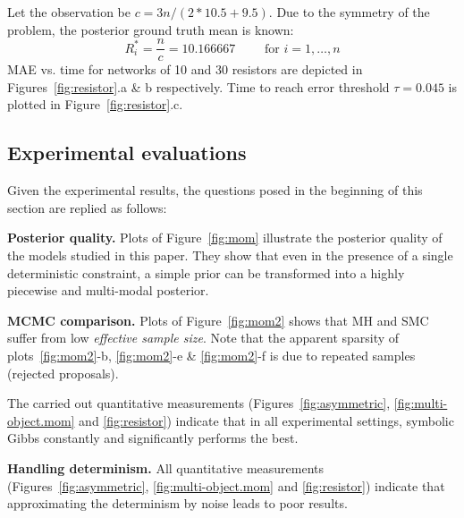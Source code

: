 \documentclass[]{article}
\begin{document}
Let the observation be $c = {3n}/{(2*10.5 + 9.5)}$.
Due to the symmetry of the problem, the posterior ground truth mean is known:
\begin{equation*}
R_i^* = \frac{n}{c} = 10.166667\qquad \text{ for } i = 1, \ldots, n
\end{equation*}
MAE vs. time for networks of 10 and 30 resistors are depicted in 
Figures~\ref{fig:resistor}.a \& b respectively.
Time to reach error threshold $\tau = 0.045$ is plotted in 
Figure~\ref{fig:resistor}.c.


\subsection{Experimental evaluations}
\label{sect:experimental.evaluations}
Given the experimental results, 
the questions posed in the beginning of this section are replied as follows:

{\bf Posterior quality.} 
Plots of Figure~\ref{fig:mom} illustrate 
the posterior quality of the models studied in this paper.
They show that  
even in the presence of a single deterministic constraint, 
a simple prior can be transformed into a highly piecewise and multi-modal posterior.

{\bf MCMC comparison.}
Plots of Figure~\ref{fig:mom2} shows that MH and SMC suffer from low \emph{effective sample size}. 
Note that the apparent sparsity of plots~\ref{fig:mom2}-b, \ref{fig:mom2}-e \& \ref{fig:mom2}-f is due to repeated samples (rejected proposals).

The carried out quantitative measurements 
(Figures~\ref{fig:asymmetric},  \ref{fig:multi-object.mom} and \ref{fig:resistor}) 
indicate that in all experimental settings,
symbolic Gibbs constantly and significantly performs the best.



{\bf Handling determinism.}
All quantitative measurements 
(Figures~\ref{fig:asymmetric},  \ref{fig:multi-object.mom} and 
\ref{fig:resistor})
indicate that approximating the determinism by noise leads to poor results.
\end{document}

